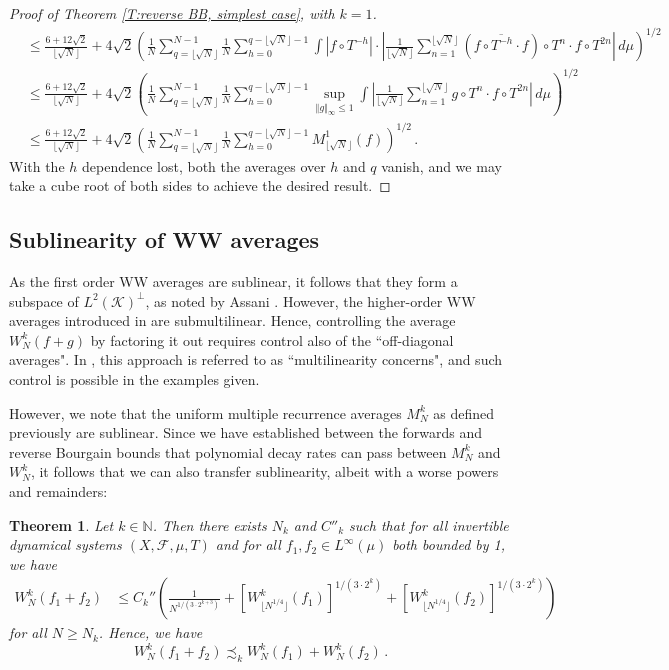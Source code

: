 \documentclass[11pt, oneside]{amsart}   	%
\newcommand{\1}{\mathbbm{1}}
\newcommand{\N}{\mathbb{N}}
\newcommand{\floor}[1]{\lfloor#1\rfloor}
\newtheorem{theorem}{Theorem}[section]
\theoremstyle{definition}
\begin{document}
\begin{proof}[Proof of Theorem \ref{T:reverse BB, simplest case}, with $k=1$]
\begin{align*}
&\leq \frac{6 +12\sqrt{2}}{\floor{\sqrt{N}}} + 4\sqrt{2} \left(  \frac{1}{N} \sum_{q=\floor{\sqrt{N}}}^{N-1} \frac{1}{N}\sum_{h = 0}^{q-\floor{\sqrt{N}}-1} \int |f\circ T^{-h}| \cdot \left|\frac{1}{\floor{\sqrt{N}}}  \sum_{n=1}^{\floor{\sqrt{N}}} (\overline{f\circ T^{-h} \cdot f}) \circ T^n \cdot f\circ T^{2n} \right| \, d\mu \right)^{1/2} \\
&\leq \frac{6 +12\sqrt{2}}{\floor{\sqrt{N}}} + 4\sqrt{2} \left(  \frac{1}{N} \sum_{q=\floor{\sqrt{N}}}^{N-1} \frac{1}{N}\sum_{h = 0}^{q-\floor{\sqrt{N}}-1} \sup_{\Vert g \Vert_\infty \leq 1}\int\left|\frac{1}{\floor{\sqrt{N}}}  \sum_{n=1}^{\floor{\sqrt{N}}} g\circ T^n \cdot f\circ T^{2n} \right| \, d\mu \right)^{1/2} \\
&\leq \frac{6 +12\sqrt{2}}{\floor{\sqrt{N}}} + 4\sqrt{2} \left(  \frac{1}{N} \sum_{q=\floor{\sqrt{N}}}^{N-1} \frac{1}{N}\sum_{h = 0}^{q-\floor{\sqrt{N}}-1} M^1_{\floor{\sqrt{N}}}(f) \right)^{1/2}\, .
\end{align*}
With the $h$ dependence lost, both the averages over $h$ and $q$ vanish, and we may take a cube root of both sides to achieve the desired result.
\end{proof}

\subsection{Sublinearity of WW averages}\label{S:sublinear}
As the first order WW averages are sublinear, it follows that they form a subspace of $L^2(\mathcal{K})^\perp$, as noted by Assani \cite{assani}. However, the higher-order WW averages introduced in \cite{assani2024higherorderwienerwintnersystems} are submultilinear. Hence, controlling the average $W_N^k(f+g)$ by factoring it out requires control also of the ``off-diagonal averages". In \cite{assani2024higherorderwienerwintnersystems}, this approach is referred to as ``multilinearity concerns", and such control is possible in the examples given.

However, we note that the uniform multiple recurrence averages $M_N^k$ as defined previously are sublinear. Since we have established between the forwards and reverse Bourgain bounds that polynomial decay rates can pass between $M_N^k$ and $W_N^k$, it follows that we can also transfer sublinearity, albeit with a worse powers and remainders:

\begin{theorem}\label{T:WW linearity- basic estimate}
Let $k\in \N$. Then there exists $N_k$ and $C''_k$ such that for all invertible dynamical systems $(X, \mathcal{F}, \mu, T)$ and for all $f_1, f_2\in L^\infty(\mu)$ both bounded by 1, we have
\begin{align}
W_N^k(f_1 + f_2) &\leq C_k'' \left( \frac{1}{N^{1/(3\cdot 2^{k+3})}} + \left[W_{\floor{N^{1/4}}}^k (f_1)\right]^{1/(3 \cdot 2^k)} + \left[W_{\floor{N^{1/4}}}^k (f_2)\right]^{1/(3 \cdot 2^k)}\right)
\end{align}
for all $N \geq N_k$. Hence, we have
$$W_N^k(f_1 + f_2) \precsim_k W_N^k(f_1) + W_N^k(f_2) \, .$$
\end{theorem}
\end{document}
